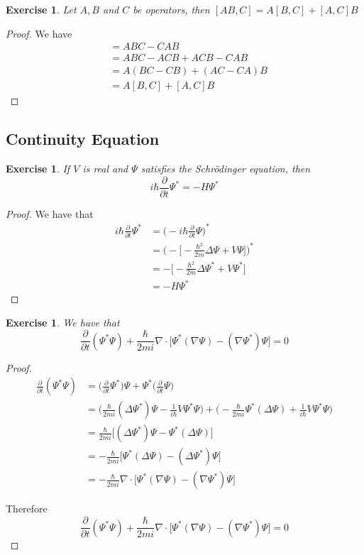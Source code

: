 \documentclass[12pt]{amsart}
\newtheorem{ex}[thm]{Exercise}
\newcommand{\Del}{\Delta}
\newcommand{\p}[1]{\frac{\partial}{\partial{#1}}}
\begin{document}
\begin{ex}
Let $A,B$ and $C$ be operators, then $[AB,C] = A[B,C] + [A,C]B$
\end{ex}

\begin{proof} We have 
\begin{align*}
[AB,C]
&= ABC - CAB\\
&= ABC - ACB + ACB -CAB\\
&= A(BC - CB) + (AC-CA)B\\
&= A[B,C] + [A,C]B
\end{align*}
\end{proof}

\subsection{Continuity Equation}

\begin{ex}
If $V$ is real and $\Psi$ satisfies the Schr\"{o}dinger equation, then $$i\hbar \p{t} \Psi^* = -H\Psi^* $$
\end{ex}

\begin{proof}
We have that 
\begin{align*}
i \hbar \p{t} \Psi^{*} 
&= \bigg(-i \hbar \p{t} \Psi\bigg)^*\\
&=\bigg( - \bigg[-\frac{\hbar^2}{2m}\Del \Psi + V \Psi \bigg] \bigg)^*\\
&= - \bigg[ -\frac{\hbar^2}{2m}\Del \Psi^* + V \Psi^*\bigg]\\
&= -H \Psi^*
\end{align*}
\end{proof}

\begin{ex}
We have that $$\p{t} (\Psi^* \Psi) + \frac{\hbar}{2mi} \nabla \cdot \bigg[ \Psi^* (\nabla \Psi) - (\nabla \Psi^*) \Psi\bigg] = 0 $$
\end{ex}

\begin{proof}
\begin{align*}
\p{t}(\Psi^* \Psi) 
&= \bigg(\p{t} \Psi^* \bigg) \Psi + \Psi^* \bigg(\p{t} \Psi \bigg)\\
&= \bigg( \frac{\hbar}{2mi} (\Del \Psi^*) \Psi - \frac{1}{i \hbar }V \Psi^* \Psi\bigg) + \bigg( -\frac{\hbar}{2mi}  \Psi^* (\Del \Psi) + \frac{1}{i \hbar }V \Psi^* \Psi \bigg)\\
&= \frac{\hbar}{2mi} \bigg[ (\Del \Psi^*) \Psi - \Psi^* (\Del \Psi) \bigg]\\
&= -\frac{\hbar}{2mi} \bigg[ \Psi^* (\Del \Psi) - (\Del \Psi^*) \Psi\bigg]\\
&= - \frac{\hbar}{2mi} \nabla \cdot \bigg[\Psi^* (\nabla \Psi) - (\nabla \Psi^*) \Psi \bigg]
\end{align*}

Therefore  $$\p{t} (\Psi^* \Psi) + \frac{\hbar}{2mi} \nabla \cdot \bigg[ \Psi^* (\nabla \Psi) - (\nabla \Psi^*) \Psi\bigg] = 0 $$
\end{proof}
\end{document}
